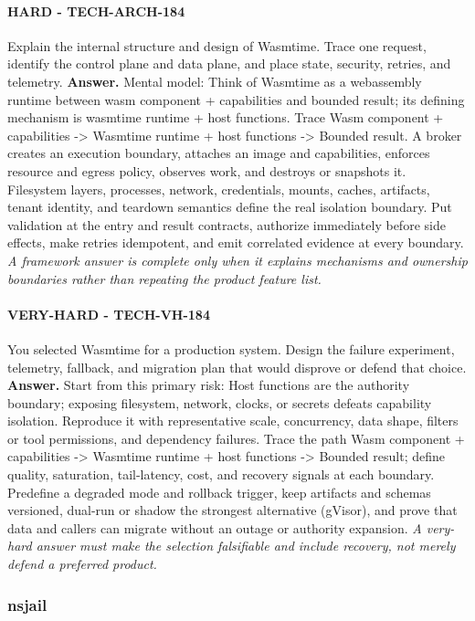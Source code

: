 \paragraph{HARD - TECH-ARCH-184} Explain the internal structure and design of Wasmtime. Trace one request, identify the control plane and data plane, and place state, security, retries, and telemetry.
\textbf{Answer.} Mental model: Think of Wasmtime as a webassembly runtime between wasm component + capabilities and bounded result; its defining mechanism is wasmtime runtime + host functions. Trace Wasm component + capabilities -> Wasmtime runtime + host functions -> Bounded result. A broker creates an execution boundary, attaches an image and capabilities, enforces resource and egress policy, observes work, and destroys or snapshots it. Filesystem layers, processes, network, credentials, mounts, caches, artifacts, tenant identity, and teardown semantics define the real isolation boundary. Put validation at the entry and result contracts, authorize immediately before side effects, make retries idempotent, and emit correlated evidence at every boundary.
\textit{A framework answer is complete only when it explains mechanisms and ownership boundaries rather than repeating the product feature list.}
\paragraph{VERY-HARD - TECH-VH-184} You selected Wasmtime for a production system. Design the failure experiment, telemetry, fallback, and migration plan that would disprove or defend that choice.
\textbf{Answer.} Start from this primary risk: Host functions are the authority boundary; exposing filesystem, network, clocks, or secrets defeats capability isolation. Reproduce it with representative scale, concurrency, data shape, filters or tool permissions, and dependency failures. Trace the path Wasm component + capabilities -> Wasmtime runtime + host functions -> Bounded result; define quality, saturation, tail-latency, cost, and recovery signals at each boundary. Predefine a degraded mode and rollback trigger, keep artifacts and schemas versioned, dual-run or shadow the strongest alternative (gVisor), and prove that data and callers can migrate without an outage or authority expansion.
\textit{A very-hard answer must make the selection falsifiable and include recovery, not merely defend a preferred product.}
\subsubsection*{nsjail}
